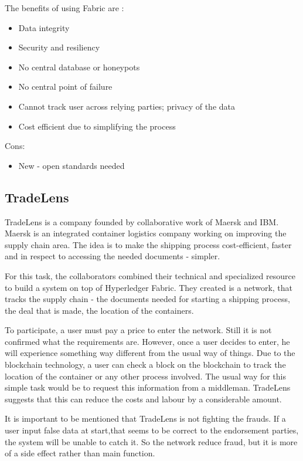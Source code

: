 \documentclass[a4paper,11pt]{report}
\begin{document}
The benefits of using Fabric are : 
\begin{itemize}
\item Data integrity 
\item Security and resiliency
\item No central database or honeypots 
\item No central point of failure
\item Cannot track user across relying parties; privacy of the data
\item Cost efficient due to simplifying the process
\end{itemize}
Cons: 
\begin{itemize}
\item New - open standards needed 
\end{itemize}

\subsection{TradeLens}
\label{tradelens}

	TradeLens is a company founded by collaborative work of Maersk and IBM. Maersk is an integrated container logistics company working on improving the supply chain area. The idea is to make the shipping process cost-efficient, faster and in respect to accessing the needed documents - simpler.
	 
	For this task, the collaborators combined their technical and specialized resource to build a system on top of Hyperledger Fabric. They created is a network, that tracks the supply chain - the documents needed for starting a shipping process, the deal that is made, the location of the containers.
	 
	To participate, a user must pay a price to enter the network. Still it is not confirmed what the requirements are. However, once a user decides to enter, he will experience something way different from the usual way of things. Due to the blockchain technology, a user can check a block on the blockchain to track the location of the container or any other process involved. The usual way for this simple task would be to request this information from a middleman. TradeLens suggests that this can reduce the costs and labour by a considerable amount. \cite{tradeLensFounders}
	
	It is important to be mentioned that TradeLens is not fighting the frauds. If a user input false data at start,that seems to be correct to the endorsement parties, the system will be unable to catch it. So the network reduce fraud, but it is more of a side effect rather than main function.
	
\end{document}
